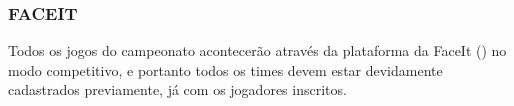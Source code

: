 \subsubsection{FACEIT}

Todos os jogos do campeonato acontecerão através da plataforma da FaceIt () no modo competitivo, e portanto todos os times devem estar devidamente cadastrados previamente, já com os jogadores inscritos.
